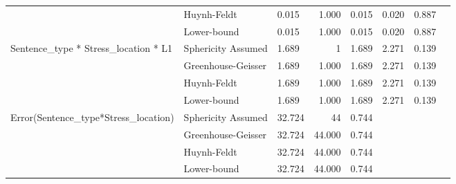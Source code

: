 \documentclass[a4paper]{article}
\begin{document}
\begin{table}[H]
\begin{center}
\begin{tabular}{p{}p{}|l|r|r|r|r|r|}
\cline{2-7}
                                                        & Huynh-Feldt        & 0.015                             & 1.000                   & 0.015                            & 0.020                  & 0.887                      \\ 
\cline{2-7}
                                                        & Lower-bound        & 0.015                             & 1.000                   & 0.015                            & 0.020                  & 0.887                      \\ 
\hline
\multirow{4}{*}{Sentence\_type * Stress\_location * L1} & Sphericity Assumed & 1.689                             & 1                       & 1.689                            & 2.271                  & 0.139                      \\ 
\cline{2-7}
                                                        & Greenhouse-Geisser & 1.689                             & 1.000                   & 1.689                            & 2.271                  & 0.139                      \\ 
\cline{2-7}
                                                        & Huynh-Feldt        & 1.689                             & 1.000                   & 1.689                            & 2.271                  & 0.139                      \\ 
\cline{2-7}
                                                        & Lower-bound        & 1.689                             & 1.000                   & 1.689                            & 2.271                  & 0.139                      \\ 
\hline
\multirow{4}{*}{Error(Sentence\_type*Stress\_location)} & Sphericity Assumed & 32.724                            & 44                      & 0.744                            & \multicolumn{1}{l|}{~} & \multicolumn{1}{l|}{~}     \\ 
\cline{2-7}
                                                        & Greenhouse-Geisser & 32.724                            & 44.000                  & 0.744                            & \multicolumn{1}{l|}{~} & \multicolumn{1}{l|}{~}     \\ 
\cline{2-7}
                                                        & Huynh-Feldt        & 32.724                            & 44.000                  & 0.744                            & \multicolumn{1}{l|}{~} & \multicolumn{1}{l|}{~}     \\ 
\cline{2-7}
                                                        & Lower-bound        & 32.724                            & 44.000                  & 0.744                            & \multicolumn{1}{l|}{~} & \multicolumn{1}{l|}{~}     \\
\hline
\end{tabular}
\end{center}
\end{table}
\end{document}
